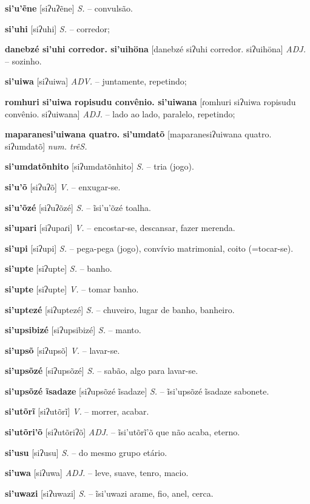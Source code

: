 \textbf{si'u'ẽne} [siʔuʔẽne] \textit{S.} -- convulsão.

\textbf{si'uhi} [siʔuhi] \textit{S.} -- corredor;

\textbf{danebzé si'uhi corredor. si'uihöna} [danebzé siʔuhi corredor. siʔuihöna] \textit{ADJ.} -- sozinho.

\textbf{si'uiwa} [siʔuiwa] \textit{ADV.} -- juntamente, repetindo;

\textbf{romhuri si'uiwa ropisudu convênio. si'uiwana} [ɾomhuri siʔuiwa ropisudu convênio. siʔuiwana] \textit{ADJ.} -- lado ao lado, paralelo, repetindo;

\textbf{maparanesi'uiwana quatro. si'umdatõ} [maparanesiʔuiwana quatro. siʔumdatõ] \textit{num. trêS.}

\textbf{si'umdatõnhito} [siʔumdatõnhito] \textit{S.} -- tria (jogo).

\textbf{si'u'õ} [siʔuʔõ] \textit{V.} -- enxugar-se.

\textbf{si'u'õzé} [siʔuʔõzé] \textit{S.} -- ĩsi'u'õzé toalha.

\textbf{si'upari} [siʔupaɾi] \textit{V.} -- encostar-se, descansar, fazer merenda.

\textbf{si'upi} [siʔupi] \textit{S.} -- pega-pega (jogo), convívio matrimonial, coito (=tocar-se).

\textbf{si'upte} [siʔupte] \textit{S.} -- banho.

\textbf{si'upte} [siʔupte] \textit{V.} -- tomar banho.

\textbf{si'uptezé} [siʔuptezé] \textit{S.} -- chuveiro, lugar de banho, banheiro.

\textbf{si'upsibizé} [siʔupsibizé] \textit{S.} -- manto.

\textbf{si'upsõ} [siʔupsõ] \textit{V.} -- lavar-se.

\textbf{si'upsõzé} [siʔupsõzé] \textit{S.} -- sabão, algo para lavar-se.

\textbf{si'upsõzé ĩsadaze} [siʔupsõzé ĩsadaze] \textit{S.} -- ĩsi'upsõzé ĩsadaze sabonete.

\textbf{si'utõrĩ} [siʔutõrĩ] \textit{V.} -- morrer, acabar.

\textbf{si'utõri'õ} [siʔutõriʔõ] \textit{ADJ.} -- ĩsi'utõrĩ'õ que não acaba, eterno.

\textbf{si'usu} [siʔusu] \textit{S.} -- do mesmo grupo etário.

\textbf{si'uwa} [siʔuwa] \textit{ADJ.} -- leve, suave, tenro, macio.

\textbf{si'uwazi} [siʔuwazi] \textit{S.} -- ĩsi'uwazi arame, fio, anel, cerca.

